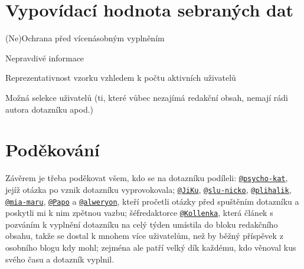 \documentclass[12pt, a4paper, twoside]{article}
\makeatletter
\newcommand{\suser}[1]{\href{https://www.signaly.cz/#1}{\texttt{@#1}}}
\makeatother
\begin{document}
\section{Vypovídací hodnota sebraných dat}

(Ne)Ochrana před vícenásobným vyplněním

Nepravdivé informace

Reprezentativnost vzorku vzhledem k počtu aktivních uživatelů

Možná selekce uživatelů (ti, které vůbec nezajímá redakční obsah,
nemají rádi autora dotazníku apod.)

\section*{Poděkování}

Závěrem je třeba poděkovat všem, kdo se na dotazníku podíleli:
\suser{psycho-kat}, jejíž otázka po 
vznik dotazníku vyprovokovala;
\suser{JiKu}, \suser{slu-nicko}, \suser{plihalik}, \suser{mia-maru},
\suser{Papo} a \suser{alweryon}, kteří pročetli otázky před spuštěním
dotazníku a poskytli mi k nim zpětnou vazbu;
šéfredaktorce \suser{Kollenka}, která článek s pozváním k vyplnění
dotazníku na celý týden umístila do bloku redakčního obsahu,
takže se dostal
k mnohem více uživatelům, než by běžný příspěvek z osobního blogu
kdy mohl;
zejména ale patří velký dík každému, kdo věnoval kus svého času
a dotazník vyplnil.

\tableofcontents

\printbibliography
\end{document}
